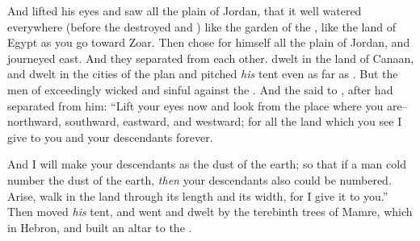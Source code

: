 \bverse And  lifted his eyes and saw all the plain of Jordan, that it \was well watered everywhere (before the \lord destroyed  and ) like the garden of the \lord, like the land of Egypt as you go toward Zoar.
\bverse Then  chose for himself all the plain of Jordan, and  journeyed east. And they separated from each other.
\bverse {} dwelt in the land of Canaan, and  dwelt in the cities of the plan and pitched \textit{his} tent even as far as .
\bverse But the men of  \were exceedingly wicked and sinful against the \lord.
\bverse And the \lord said to , after  had separated from him: ``Lift your eyes now and look from the place where you are--northward, southward, eastward, and westward;
\bverse for all the land which you see I give to you and your descendants forever.

\bverse And I will make your descendants as the dust of the earth; so that if a man cold number the dust of the earth, \textit{then} your descendants also could be numbered.
\bverse Arise, walk in the land through its length and its width, for I give it to you.''
\bverse Then  moved \textit{his} tent, and went and dwelt by the terebinth trees of Mamre, which \are in Hebron, and built an altar to the \lord.
